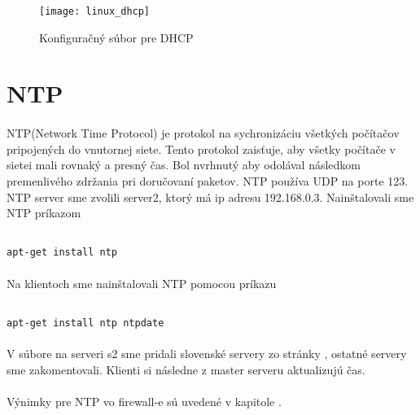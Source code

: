 \begin{figure}[!htb]
\centering
\texttt{[image: linux\_dhcp]}
\caption{Konfiguračný súbor pre DHCP}
\label{fig:dhcp_config}
\end{figure}

\section{NTP}
\paragraph{}
NTP(Network Time Protocol) je protokol na sychronizáciu všetkých počítačov pripojených do vnutornej siete. Tento protokol zaisťuje, aby všetky počítače v sietei mali rovnaký a presný čas. Bol nvrhnutý aby odolával následkom premenlivého zdržania pri doručovaní paketov. NTP používa UDP na porte 123. NTP server sme zvolili server2, ktorý má ip adresu 192.168.0.3. Nainštalovali sme NTP príkazom

\noindent
{\selectfont
\begin{small}
\begin{verbatim}

apt-get install ntp

\end{verbatim}
\end{small}
}


\paragraph{}
Na klientoch sme nainštalovali NTP pomocou príkazu


\noindent
{\selectfont
\begin{small}
\begin{verbatim}

apt-get install ntp ntpdate

\end{verbatim}
\end{small}
}

\paragraph{}
V súbore na serveri s2  sme pridali slovenské servery zo stránky , ostatné servery sme zakomentovali. Klienti si následne z master serveru aktualizujú čas.
\paragraph{}
Výnimky pre NTP vo firewall-e sú uvedené v kapitole .

